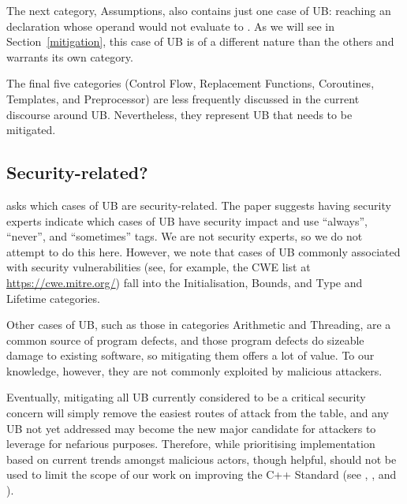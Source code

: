 The next category, Assumptions, also contains just one case of UB: reaching an \tcode{[[assume]]} declaration whose operand would not evaluate to . As we will see in Section~\ref{mitigation}, this case of UB is of a different nature than the others and warrants its own category.

The final five categories (Control Flow, Replacement Functions, Coroutines, Templates, and Preprocessor) are less frequently discussed in the current discourse around UB. Nevertheless, they represent UB that needs to be mitigated.

\subsection{Security-related?}
 
\cite{P3656R1} asks which cases of UB are security-related. The paper suggests having security experts indicate which cases of UB have security impact and use ``always'', ``never'', and ``sometimes'' tags. We are not security experts, so we do not attempt to do this here. However, we note that cases of UB commonly associated with security vulnerabilities (see, for example, the CWE list at \url{https://cwe.mitre.org/}) fall into the Initialisation, Bounds, and Type and Lifetime categories. 

Other cases of UB, such as those in categories Arithmetic and Threading, are a common source of program defects, and those program defects do sizeable damage to existing software, so mitigating them offers a lot of value. To our knowledge, however, they are not commonly exploited by malicious attackers.

Eventually, mitigating all UB currently considered to be a critical security concern will simply remove the easiest routes of attack from the table, and any UB not yet addressed may become the new major candidate for attackers to leverage for nefarious purposes.  Therefore, while prioritising implementation based on current trends amongst malicious actors, though helpful, should not be used to limit the scope of our work on improving the C++ Standard (see \cite{Sutter2024}, \cite{P3500R1}, and \cite{P3578R0}).

